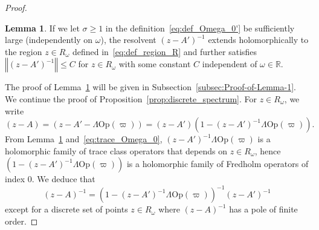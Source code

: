 \documentclass[10pt]{amsart}
\theoremstyle{definition}\newtheorem{defi}[theo]{Definition}\newtheorem{rema}[theo]{Remark}\newtheorem{exam}[theo]{Example}\newtheorem{exem}[theo]{Example}\newtheorem{nota}[theo]{Notation}
\newcommand{\Opp}{\mathrm{Op}}
\newcommand{\bbR}{\mathbb{R}}
\newtheorem{lem}[theo]{Lemma}\newtheorem{rem}[theo]{Remark}
\begin{document}
\begin{proof}
\begin{cBoxB}{}
\begin{lem}\label{lem:bounded_resolvent_of_A'}
If we let $\sigma\geq1$ in the definition~\eqref{eq:def_Omega_0'} be sufficiently large (independently on $\omega$), the resolvent $(z-A')^{-1}$ extends holomorphically to the region $z\in R_{\omega}$ defined in~\eqref{eq:def_region_R} and further satisfies $\left\Vert (z-A')^{-1}\right\Vert \leq C$ for $z\in R_{\omega}$ with some constant $C$ independent of $\omega\in\bbR$.
\end{lem}
\end{cBoxB}

The proof of Lemma~\ref{lem:bounded_resolvent_of_A'} will be given in Subsection~\ref{subsec:Proof-of-Lemma-1}. We continue the proof of Proposition~\ref{prop:discrete_spectrum}. For $z\in R_{\omega}$, we write
\[
\left(z-A\right)=\left(z-A'-\Lambda\Opp \left(\varpi\right)\right)=\left(z-A'\right)\left(1-\left(z-A'\right)^{-1}\Lambda\Opp \left(\varpi\right)\right).
\]
From Lemma~\ref{lem:bounded_resolvent_of_A'} and~\eqref{eq:trace_Omega_0}, $(z-A')^{-1}\Lambda\Opp (\varpi)$ is a holomorphic family of trace class operators that depends on $z\in R_{\omega}$, hence $(1-(z-A')^{-1}\Lambda\Opp (\varpi))$ is a holomorphic family of Fredholm operators of index $0$. We deduce that
\[
\left(z-A\right)^{-1}=\left(1-\left(z-A'\right)^{-1}\Lambda\Opp \left(\varpi\right)\right)^{-1}\left(z-A'\right)^{-1}
\]
except for a discrete set of points $z\in R_{\omega}$ where $(z-A)^{-1}$ has a pole of finite order.


\end{proof}
\end{document}
